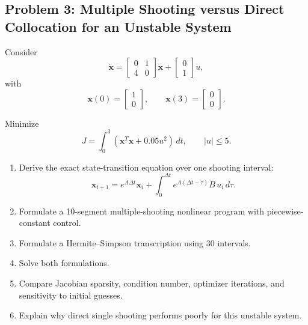 \subsection*{Problem 3: Multiple Shooting versus Direct Collocation for an Unstable System}

Consider
\begin{equation}
\dot{\mathbf{x}}
=
\begin{bmatrix}
0 & 1\\
4 & 0
\end{bmatrix}
\mathbf{x}
+
\begin{bmatrix}
0\\
1
\end{bmatrix}u,
\end{equation}
with
\begin{equation}
\mathbf{x}(0)=
\begin{bmatrix}
1\\
0
\end{bmatrix},
\qquad
\mathbf{x}(3)=
\begin{bmatrix}
0\\
0
\end{bmatrix}.
\end{equation}

Minimize
\begin{equation}
J=
\int_0^3
\left(
\mathbf{x}^{T}\mathbf{x}
+
0.05u^2
\right)\,dt,
\qquad
|u|\leq 5.
\end{equation}

\begin{enumerate}
    \item Derive the exact state-transition equation over one shooting interval:
    \begin{equation}
    \mathbf{x}_{i+1}
    =
    e^{A\Delta t}\mathbf{x}_i
    +
    \int_0^{\Delta t}
    e^{A(\Delta t-\tau)}B\,u_i\,d\tau.
    \end{equation}
    
    \item Formulate a 10-segment multiple-shooting nonlinear program with
    piecewise-constant control.
    
    \item Formulate a Hermite--Simpson transcription using 30 intervals.
    
    \item Solve both formulations.
    
    \item Compare Jacobian sparsity, condition number, optimizer iterations,
    and sensitivity to initial guesses.
    
    \item Explain why direct single shooting performs poorly for this unstable
    system.
\end{enumerate}


